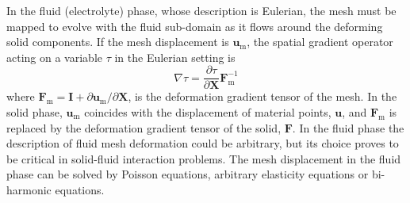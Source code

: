 In the fluid (electrolyte) phase, whose description is Eulerian, the mesh must be mapped to evolve with the fluid sub-\/domain as it flows around the deforming solid components. If the mesh displacement is $\boldsymbol{u}_\text{m}$, the spatial gradient operator acting on a variable $\tau$ in the Eulerian setting is \[ \nabla \tau=\frac{\partial\tau}{\partial\boldsymbol{X}}\boldsymbol{F}_\text{m}^{-1} \] where $\boldsymbol{F}_\text{m}= \boldsymbol{I} +\partial \boldsymbol{u}_\text{m}/\partial \boldsymbol{X}$, is the deformation gradient tensor of the mesh. In the solid phase, $\boldsymbol{u}_\text{m}$ coincides with the displacement of material points, $\boldsymbol{u}$, and $\boldsymbol{F}_\text{m}$ is replaced by the deformation gradient tensor of the solid, $\boldsymbol{F}$. In the fluid phase the description of fluid mesh deformation could be arbitrary, but its choice proves to be critical in solid-\/fluid interaction problems. The mesh displacement in the fluid phase can be solved by Poisson equations, arbitrary elasticity equations or bi-\/harmonic equations.

